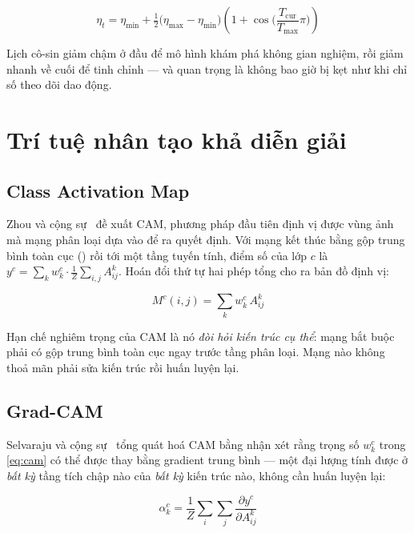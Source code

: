 \begin{equation}
    \eta_t = \eta_{\min} + \tfrac{1}{2}\big(\eta_{\max} - \eta_{\min}\big)
             \left(1 + \cos\!\Big(\frac{T_{\text{cur}}}{T_{\max}}\pi\Big)\right)
    \label{eq:cosine}
\end{equation}

Lịch cô-sin giảm chậm ở đầu để mô hình khám phá không gian nghiệm, rồi giảm nhanh
về cuối để tinh chỉnh --- và quan trọng là không bao giờ bị kẹt như
 khi chỉ số theo dõi dao động.

\section{Trí tuệ nhân tạo khả diễn giải}
\label{sec:xai}

\subsection{Class Activation Map}

Zhou và cộng sự~\cite{zhou2016cam} đề xuất CAM, phương pháp đầu tiên định vị được
vùng ảnh mà mạng phân loại dựa vào để ra quyết định. Với mạng kết thúc bằng gộp
trung bình toàn cục () rồi tới một tầng tuyến tính,
điểm số của lớp $c$ là $y^{c} = \sum_{k} w^{c}_{k} \cdot \frac{1}{Z}\sum_{i,j} A^{k}_{ij}$.
Hoán đổi thứ tự hai phép tổng cho ra bản đồ định vị:

\begin{equation}
    M^{c}(i, j) = \sum_{k} w^{c}_{k} \, A^{k}_{ij}
    \label{eq:cam}
\end{equation}

Hạn chế nghiêm trọng của CAM là nó \emph{đòi hỏi kiến trúc cụ thể}: mạng bắt buộc
phải có gộp trung bình toàn cục ngay trước tầng phân loại. Mạng nào không thoả
mãn phải sửa kiến trúc rồi huấn luyện lại.

\subsection{Grad-CAM}

Selvaraju và cộng sự~\cite{selvaraju2017gradcam} tổng quát hoá CAM bằng nhận xét
rằng trọng số $w^{c}_{k}$ trong \cref{eq:cam} có thể được thay bằng gradient trung
bình --- một đại lượng tính được ở \emph{bất kỳ} tầng tích chập nào của
\emph{bất kỳ} kiến trúc nào, không cần huấn luyện lại:

\begin{equation}
    \alpha^{c}_{k} = \frac{1}{Z}\sum_{i}\sum_{j} \frac{\partial y^{c}}{\partial A^{k}_{ij}}
    \label{eq:gradcam_alpha}
\end{equation}

